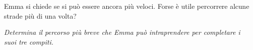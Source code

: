 {{\centering%
\par}

Emma si chiede se si può essere ancora più veloci.
Forse è utile percorrere alcune strade più di una volta?



{\em
Determina il percorso più breve che Emma può intraprendere per completare i suoi tre compiti.

{\centering%
\par}


}



}
